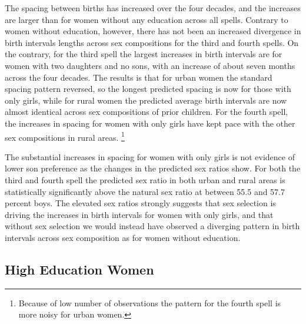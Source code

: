 \documentclass[12pt,letterpaper]{article}
\begin{document}
The spacing between births has increased over the four decades, and the increases are 
larger than for women without any education across all spells.
Contrary to women without education, however, there has not been an increased divergence 
in birth intervals lengths across sex compositions for the third and fourth spells.
On the contrary, for the third spell the largest increases in birth intervals are for women with
two daughters and no sons, with an increase of about seven months across the four decades.
The results is that for urban women the standard spacing pattern reversed, so the longest 
predicted spacing is now for those with only girls, while for rural women the predicted 
average birth intervals are now almost identical across sex compositions of prior children.
For the fourth spell, the increases in spacing for women with only girls have kept pace
with the other sex compositions in rural areas.%
\footnote{
Because of low number of observations the pattern for the fourth spell is more noisy for 
urban women.
}

The substantial increases in spacing for women with only girls is not evidence of lower
son preference as the changes in the predicted sex ratios show.
For both the third and fourth spell the predicted sex ratio in both urban and rural
areas is statistically significantly above the natural sex ratio at between 55.5 and 57.7 
percent boys.
The elevated sex ratios strongly suggests that sex selection is driving the increases in
birth intervals for women with only girls, and that without sex selection we would 
instead have observed a diverging pattern in birth intervals across sex composition as
for women without education.


\subsection{High Education Women}


\end{document}
